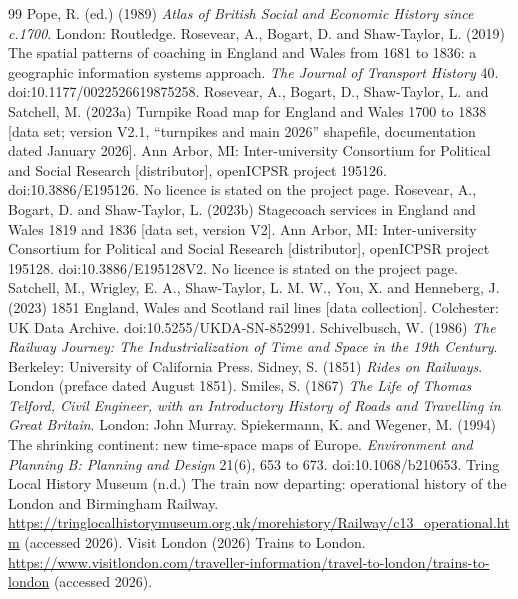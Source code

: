 \begin{thebibliography}{99}
 Pope, R. (ed.) (1989) \textit{Atlas of British Social and Economic History since c.1700}. London: Routledge.
 Rosevear, A., Bogart, D. and Shaw-Taylor, L. (2019) The spatial patterns of coaching in England and Wales from 1681 to 1836: a geographic information systems approach. \textit{The Journal of Transport History} 40. doi:10.1177/0022526619875258.
 Rosevear, A., Bogart, D., Shaw-Taylor, L. and Satchell, M. (2023a) Turnpike Road map for England and Wales 1700 to 1838 [data set; version V2.1, ``turnpikes and main 2026'' shapefile, documentation dated January 2026]. Ann Arbor, MI: Inter-university Consortium for Political and Social Research [distributor], openICPSR project 195126. doi:10.3886/E195126. No licence is stated on the project page.
 Rosevear, A., Bogart, D. and Shaw-Taylor, L. (2023b) Stagecoach services in England and Wales 1819 and 1836 [data set, version V2]. Ann Arbor, MI: Inter-university Consortium for Political and Social Research [distributor], openICPSR project 195128. doi:10.3886/E195128V2. No licence is stated on the project page.
 Satchell, M., Wrigley, E. A., Shaw-Taylor, L. M. W., You, X. and Henneberg, J. (2023) 1851 England, Wales and Scotland rail lines [data collection]. Colchester: UK Data Archive. doi:10.5255/UKDA-SN-852991.
 Schivelbusch, W. (1986) \textit{The Railway Journey: The Industrialization of Time and Space in the 19th Century}. Berkeley: University of California Press.
 Sidney, S. (1851) \textit{Rides on Railways}. London (preface dated August 1851).
 Smiles, S. (1867) \textit{The Life of Thomas Telford, Civil Engineer, with an Introductory History of Roads and Travelling in Great Britain}. London: John Murray.
 Spiekermann, K. and Wegener, M. (1994) The shrinking continent: new time-space maps of Europe. \textit{Environment and Planning B: Planning and Design} 21(6), 653 to 673. doi:10.1068/b210653.
 Tring Local History Museum (n.d.) The train now departing: operational history of the London and Birmingham Railway. \url{https://tringlocalhistorymuseum.org.uk/morehistory/Railway/c13_operational.htm} (accessed 2026).
 Visit London (2026) Trains to London. \url{https://www.visitlondon.com/traveller-information/travel-to-london/trains-to-london} (accessed 2026).

\end{thebibliography}
